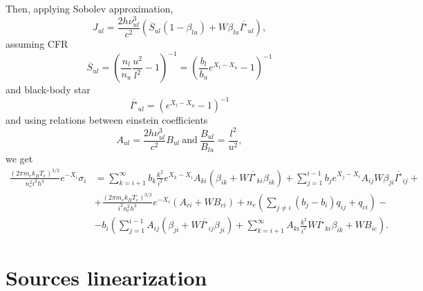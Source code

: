 \documentclass{article}
\begin{document}
Then, applying Sobolev approximation,
\[
J_{ul} = \frac{2h\nu_{ul}^3}{c^2}\left(\overline{S}_{ul}(1-\beta_{lu}) + W\beta_{lu} \overline{I^\star}_{ul}\right),
\]
assuming CFR
\[
\overline{S}_{ul} = \left(\frac{n_l}{n_u}\frac{u^2}{l^2} - 1\right)^{-1} = \left(\frac{b_l}{b_u}e^{X_l-X_u} - 1\right)^{-1}
\]
and black-body star
\[
\overline{I^\star}_{ul} = \left(e^{X_l - X_u} - 1\right)^{-1}
\]
and using relations between einstein coefficients
\[
A_{ul} = \frac{2h\nu_{ul}^3}{c^2}B_{ul}\ \mathrm{and}\ \frac{B_{ul}}{B_{lu}} = \frac{l^2}{u^2},
\]
we get
\begin{equation}
    \begin{aligned}
        \frac{(2\pi m_ek_BT_e)^{3/2}}{n_e^2i^2h^3}e^{-X_i}\sigma_i &= \sum\limits_{k=i+1}^\infty b_k\frac{k^2}{i^2}e^{X_k-X_i}A_{ki}(\beta_{ik} + W\overline{I^\star}_{ki}\beta_{ik}) + \sum\limits_{j=1}^{i-1} b_je^{X_j-X_i}A_{ij}W\beta_{ji} \overline{I^\star}_{ij} +\\
        &+\frac{(2\pi m_ek_BT_e)^{3/2}}{i^2n_e^2h^3}e^{-X_i}(A_{ci} + WB_{ci}) +n_e\left(\sum\limits_{j \neq i}(b_j-b_i)q_{ij}  + q_{ci}\right)-\\
        &-b_i\left(\sum\limits_{j=1}^{i-1}A_{ij}(\beta_{ji} + W\overline{I^\star}_{ij}\beta_{ji}) + \sum\limits_{k=i+1}^\infty A_{ki}\frac{k^2}{i^2}W\overline{I^\star}_{ki}\beta_{ik}  + WB_{ic}\right).
    \end{aligned}
\end{equation}

\section{Sources linearization}
\end{document}
